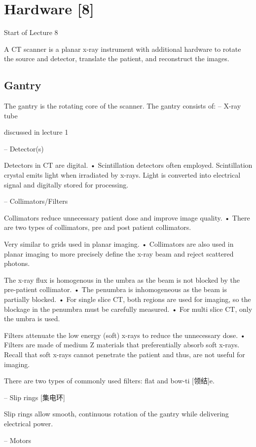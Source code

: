 \documentclass[UTF8,a4paper,11pt]{book}
\theoremstyle{mystyle}{
  \newtheorem{example}{Example}
}
\begin{document}
\section{Hardware [8]}
{\sf Start of Lecture 8}

 A CT scanner is a planar x-ray instrument with
additional hardware to rotate the source and
detector, translate the patient, and
reconstruct the images.


\subsection{Gantry}
 The gantry is the rotating core of the scanner.
  The gantry consists of:
– X-ray tube

discussed in lecture 1

– Detector(s)

Detectors in CT are digital.
• Scintillation detectors often employed.
Scintillation crystal emits light when irradiated
by x-rays.
Light is converted into electrical signal and
digitally stored for processing.

– Collimators/Filters

 Collimators  reduce unnecessary patient
dose and improve image quality.
• There are two types of collimators, pre and
post patient collimators.

Very similar to grids used in planar imaging.
• Collimators are also used in planar imaging to
more precisely define the x-ray beam and
reject scattered photons.

 The x-ray flux is homogenous in the umbra as
the beam is not blocked by the pre-patient
collimator.
• The penumbra is inhomogeneous as the beam
is partially blocked.
• For single slice CT, both regions are used for
imaging, so the blockage in the penumbra
must be carefully measured.
• For multi slice CT, only the umbra is used.

 Filters attenuate the low energy (soft) x-rays
to reduce the unnecessary dose.
• Filters are made of medium Z materials that
preferentially absorb soft x-rays. 
 Recall that soft x-rays cannot penetrate the
patient and thus, are not useful for imaging.

There are two types of commonly used filters:
flat and bow-ti [领结]e.


– Slip rings [集电环]

 Slip rings allow smooth, continuous rotation of
the gantry while delivering electrical power.


– Motors
\end{document}
